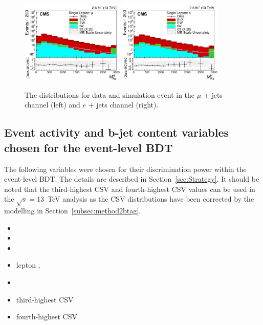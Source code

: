 \begin{figure}[ht!]
    \includegraphics[width=0.44\textwidth]{images/Run2/SumJetMassX_StackLogY.pdf}
    \includegraphics[width=0.44\textwidth]{images/Run2/SumJetMassX_StackLogY_e.pdf}
    \caption{ The \redhadmass distributions for data and simulation event in the $\mu$ + jets channel (left) and $e$ + jets channel (right).}
    \label{fig:sumjetmassx13}
\end{figure}


\subsection{Event activity and b-jet content variables chosen for the event-level BDT}
The following variables were chosen for their discrimination power within the event-level BDT. The details are described in Section~\ref{sec:Strategy}. It should be noted that the third-highest CSV and fourth-highest CSV values can be used in the $\sqrt{s} = 13$~TeV analysis as the CSV distributions have been corrected by the modelling in Section~\ref{subsec:method2btag}.


\begin{multicols}{2}
\setlength{\columnseprule}{0pt} 

\begin{itemize}
\item \htb
\item \htrat
\item \njets
\item lepton \pt, \leadleppt
\item \njetsw
\item third-highest CSV
\item fourth-highest CSV
\end{itemize}

\end{multicols}


